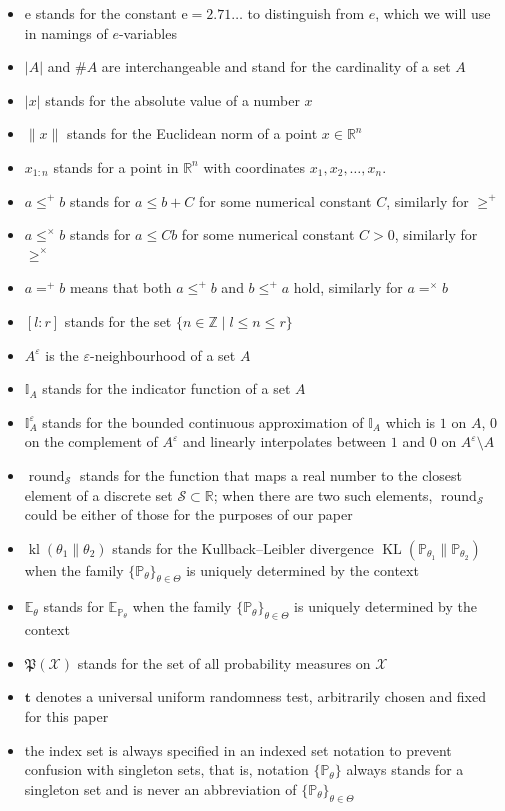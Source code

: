 \documentclass{article}
\theoremstyle{definition}
\theoremstyle{definition}
\newcommand{\intnums}{\mathbb{Z}}
\newcommand{\reals}{\mathbb{R}}
\newcommand{\probP}{\mathbb{P}}
\newcommand{\expectE}{\mathbb{E}}
\newcommand{\kl}{\operatorname{kl}}
\newcommand{\KL}{\operatorname{KL}}
\newcommand{\e}{\mathrm{e}}
\newcommand{\uut}{\mathbf{t}}
\begin{document}
\begin{itemize}
    \item $\e$ stands for the constant $\e=2.71\ldots$ to distinguish from $e$, which we will use in namings of $e$-variables
    \item $|A|$ and $\#A$ are interchangeable and stand for the cardinality of a set $A$
    \item $|x|$ stands for the absolute value of a number $x$
    \item $\|x\|$ stands for the Euclidean norm of a point $x \in \reals^n$
    \item $x_{1:n}$ stands for a point in $\reals^n$ with coordinates $x_1, x_2, \ldots, x_n$.
    \item $a \le^+ b$ stands for $a \le b + C$ for some numerical constant $C$, similarly for $\ge^+$
    \item $a \le^\times b$ stands for $a \le Cb$ for some numerical constant $C>0$, similarly for $\ge^\times$
    \item $a =^+ b$ means that both $a \le^+ b$ and $b \le^+ a$ hold, similarly for $a =^\times b$
    \item $[l:r]$ stands for the set $\{n \in\intnums \mid l \le n \le r\}$
    \item $A^\varepsilon$ is the $\varepsilon$-neighbourhood of a set $A$
    \item $\mathbb{I}_A$ stands for the indicator function of a set $A$
    \item $\mathbb{I}_A^\varepsilon$ stands for the bounded continuous approximation of $\mathbb{I}_A$ which is $1$ on $A$, $0$ on the complement of $A^\varepsilon$ and linearly interpolates between $1$ and $0$ on $A^\varepsilon\setminus A$
    \item $\operatorname{round}_{\mathcal{S}}$ stands for the function that maps a real number to the closest element of a discrete set $\mathcal{S}\subset\reals$; when there are two such elements, $\operatorname{round}_\mathcal{S}$ could be either of those for the purposes of our paper
    \item $\kl(\theta_1\|\theta_2)$ stands for the Kullback–Leibler divergence $\KL(\probP_{\theta_1}\|\probP_{\theta_2})$ when the family $\{\probP_\theta\}_{\theta\in\Theta}$ is uniquely determined by the context
    \item $\expectE_\theta$ stands for $\expectE_{\probP_\theta}$ when the family $\{\probP_\theta\}_{\theta\in\Theta}$ is uniquely determined by the context
    \item $\mathfrak{P}(\mathcal{X})$ stands for the set of all probability measures on $\mathcal{X}$
    \item $\uut$ denotes a universal uniform randomness test, arbitrarily chosen and fixed for this paper
    \item the index set is always specified in an indexed set notation to prevent confusion with singleton sets, that is, notation $\{\probP_\theta\}$ always stands for a singleton set and is never an abbreviation of $\{\probP_\theta\}_{\theta\in\Theta}$
\end{itemize}
\end{document}
